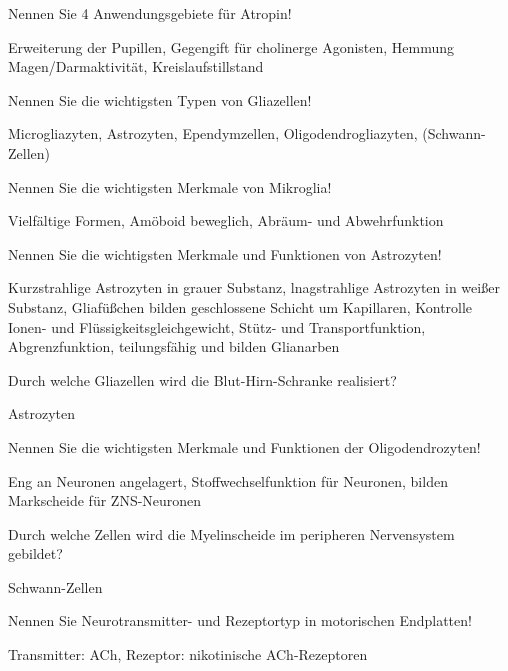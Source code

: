 \documentclass[10pt, a4paper]{exam}
\begin{document}
\begin{questions}
  \question Nennen Sie 4 Anwendungsgebiete für Atropin!
  \begin{solution}
    Erweiterung der Pupillen, Gegengift für cholinerge Agonisten, Hemmung Magen/Darmaktivität, Kreislaufstillstand
  \end{solution}

  \question Nennen Sie die wichtigsten Typen von Gliazellen!
  \begin{solution}
    Microgliazyten, Astrozyten, Ependymzellen, Oligodendrogliazyten, (Schwann-Zellen)
  \end{solution}

  \question Nennen Sie die wichtigsten Merkmale von Mikroglia!
  \begin{solution}
    Vielfältige Formen, Amöboid beweglich, Abräum- und Abwehrfunktion
  \end{solution}

  \question Nennen Sie die wichtigsten Merkmale und Funktionen von Astrozyten!
  \begin{solution}
    Kurzstrahlige Astrozyten in grauer Substanz, lnagstrahlige Astrozyten in weißer Substanz, Gliafüßchen bilden geschlossene Schicht um Kapillaren, Kontrolle Ionen- und Flüssigkeitsgleichgewicht, Stütz- und Transportfunktion, Abgrenzfunktion, teilungsfähig und bilden Glianarben
  \end{solution}

  \question Durch welche Gliazellen wird die Blut-Hirn-Schranke realisiert?
  \begin{solution}
    Astrozyten
  \end{solution}

  \question Nennen Sie die wichtigsten Merkmale und Funktionen der Oligodendrozyten!
  \begin{solution}
    Eng an Neuronen angelagert, Stoffwechselfunktion für Neuronen, bilden Markscheide für ZNS-Neuronen
  \end{solution}

  \question Durch welche Zellen wird die Myelinscheide im peripheren Nervensystem gebildet?
  \begin{solution}
    Schwann-Zellen
  \end{solution}

  \question Nennen Sie Neurotransmitter- und Rezeptortyp in motorischen Endplatten!
  \begin{solution}
    Transmitter: ACh, Rezeptor: nikotinische ACh-Rezeptoren
  \end{solution}


\end{questions}
\end{document}
